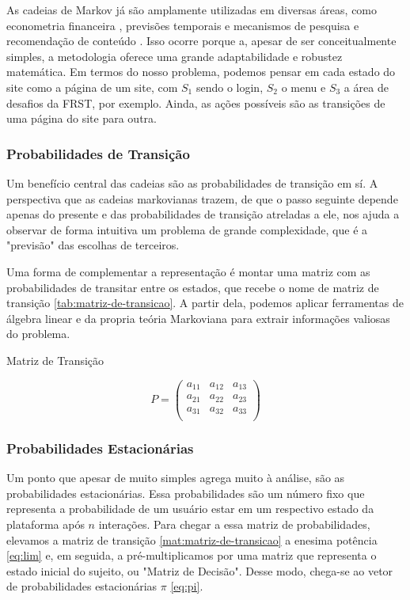As cadeias de Markov já são amplamente utilizadas em diversas áreas, como econometria financeira \cite{verhofen2005markov}, previsões temporais \cite{khiatani2017weather} e mecanismos de pesquisa e recomendação de conteúdo \cite{rai2016google}. Isso ocorre porque a, apesar de ser conceitualmente simples, a metodologia oferece uma grande adaptabilidade e robustez matemática. Em termos do nosso problema, podemos pensar em cada estado do site como a página de um site, com $S_1$ sendo o login, $S_2$ o menu e $S_3$ a área de desafios da FRST, por exemplo. Ainda, as ações possíveis são as transições de uma página do site para outra.

\subsubsection{Probabilidades de Transição}

Um benefício central das cadeias são as probabilidades de transição em sí. A perspectiva que as cadeias markovianas trazem, de que o passo seguinte depende apenas do presente e das probabilidades de transição atreladas a ele, nos ajuda a observar de forma intuitiva um problema de grande complexidade, que é a "previsão" das escolhas de terceiros. 

Uma forma de complementar a representação é montar uma  matriz com as probabilidades de transitar entre os estados, que recebe o nome de matriz de transição \ref{tab:matriz-de-transicao}. A partir dela, podemos aplicar ferramentas de álgebra linear e da propria teória Markoviana para extrair informações valiosas do problema. 

\begin{table}[h]
\centering
\caption{Matriz de Transição}
\[
P = \left( \begin{array}{ccc}
a_{11} & a_{12} & a_{13} \\
a_{21} & a_{22} & a_{23} \\
a_{31} & a_{32} & a_{33} \\
\end{array} \right)
\]
\label{mat:matriz-de-transicao}
\end{table}

\subsubsection{Probabilidades Estacionárias}

Um ponto que apesar de muito simples agrega muito à análise, são as probabilidades estacionárias. Essa probabilidades são um número fixo que representa a probabilidade de um usuário estar em um respectivo estado da plataforma após $n$ interações. Para chegar a essa matriz de probabilidades, elevamos a matriz de transição \ref{mat:matriz-de-transicao} a enesima potência \ref{eq:lim} e, em seguida, a pré-multiplicamos por uma matriz que representa o estado inicial do sujeito, ou \cite{Ross97} "Matriz de Decisão". Desse modo, chega-se ao vetor de probabilidades estacionárias $\pi$ \ref{eq:pi}. \cite{Ross97} 


